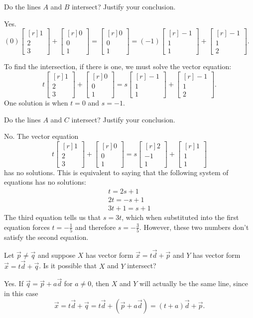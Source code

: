 \documentclass{problemset}
\newcommand{\mat}[1]{\begin{bmatrix*}[r]#1\end{bmatrix*}}
\begin{document}
	\begin{parts}
		\item Do the lines $A$ and $B$ intersect? Justify your conclusion.
			\begin{solution}
				Yes. $(0)\mat{1\\2\\3}+\mat{0\\0\\1} = \mat{0\\0\\1} = (-1)\mat{-1\\1\\1}+\mat{-1\\1\\2}$.

				To find the intersection, if there is one, we must solve the vector equation:
				\[
					t\mat{1\\2\\3}+\mat{0\\0\\1} = s\mat{-1\\1\\1}+\mat{-1\\1\\2}.
				\]
				One solution is when $t = 0$ and $s = -1$.
			\end{solution}
		\item Do the lines $A$ and $C$ intersect? Justify your conclusion.
			\begin{solution}
				No. The vector equation
				\[
					t\mat{1\\2\\3}+\mat{0\\0\\1} = s\mat{2\\-1\\1}+\mat{1\\1\\1}
				\]
				has no solutions. This is equivalent to saying that the following
				system of equations has no solutions:
				\begin{gather*}
					t = 2s + 1 \\
					2t = -s + 1 \\
					3t + 1 = s + 1
				\end{gather*}
				The third equation tells us that $s = 3t$, which when substituted
				into the first equation forces $t = -\tfrac{1}{5}$ and therefore
				$s = -\tfrac{3}{5}$. However, these two numbers don't satisfy the second
				equation.
			\end{solution}
		\item Let $\vec p\neq \vec q$ and suppose
			$X$ has vector form $\vec x=t\vec d+\vec p$ and $Y$ has
			vector form $\vec x=t\vec d+\vec q$. Is it possible
			that $X$ and $Y$ intersect?
			\begin{solution}
				Yes. If $\vec q=\vec p+a\vec d$ for $a\neq 0$, then $X$ and $Y$
				will actually be the same line, since in this case
				\[
					\vec x = t\vec d+\vec q
					= t\vec d+(\vec p+a\vec d)
					= (t+a)\vec d+\vec p.
				\]


\end{solution}
\end{parts}
\end{document}
